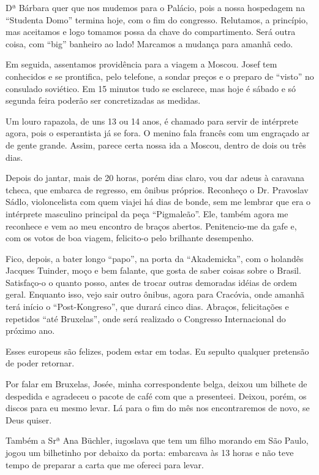 Dª Bárbara quer que nos mudemos para o Palácio, pois a nossa hospedagem na “Studenta Domo” termina hoje, com o fim do congresso. Relutamos, a princípio, mas aceitamos e logo tomamos possa da chave do compartimento. Será outra coisa, com “big” banheiro ao lado! Marcamos a mudança para amanhã cedo.

Em seguida, assentamos providência para a viagem a Moscou. Josef tem conhecidos e se prontifica, pelo telefone, a sondar preços e o preparo de “visto” no consulado soviético. Em 15 minutos tudo se esclarece, mas hoje é sábado e só segunda feira poderão ser concretizadas as medidas.

Um louro rapazola, de uns 13 ou 14 anos, é chamado para servir de intérprete agora, pois o esperantista já se fora. O menino fala francês com um engraçado ar de gente grande. Assim, parece certa nossa ida a Moscou, dentro de dois ou três dias.

Depois do jantar, mais de 20 horas, porém dias claro, vou dar adeus à caravana tcheca, que embarca de regresso, em ônibus próprios. Reconheço o Dr. Pravoslav Sádlo, violoncelista com quem viajei há dias de bonde, sem me lembrar que era o intérprete masculino principal da peça “Pigmaleão”. Ele, também agora me reconhece e vem ao meu encontro de braços abertos. Penitencio-me da gafe e, com os votos de boa viagem, felicito-o pelo brilhante desempenho.

Fico, depois, a bater longo “papo”, na porta da “Akademicka”, com o holandês Jacques Tuinder, moço e bem falante, que gosta de saber coisas sobre o Brasil. Satisfaço-o o quanto posso, antes de trocar outras demoradas idéias de ordem geral. Enquanto isso, vejo sair outro ônibus, agora para Cracóvia, onde amanhã terá início o “Post-Kongreso”, que durará cinco dias. Abraços, felicitações e repetidos “até Bruxelas”, onde será realizado o Congresso Internacional do próximo ano.

Esses europeus são felizes, podem estar em todas. Eu sepulto qualquer pretensão de poder retornar.

Por falar em Bruxelas, Josée, minha correspondente belga, deixou um bilhete de despedida e agradeceu o pacote de café com que a presenteei. Deixou, porém, os discos para eu mesmo levar. Lá para o fim do mês nos encontraremos de novo, se Deus quiser.

Também a Srª Ana Büchler, iugoslava que tem um filho morando em São Paulo, jogou um bilhetinho por debaixo da porta: embarcava às 13 horas e não teve tempo de preparar a carta que me ofereci para levar.

